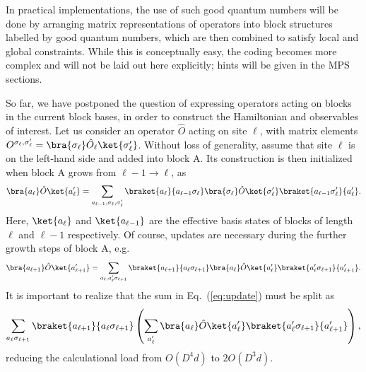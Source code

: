 In practical implementations, the use of such good quantum numbers will be done by arranging matrix representations of operators into block structures labelled by good quantum numbers, which are then combined to satisfy local and global constraints. While this is conceptually easy, the coding becomes more complex and will not be laid out here explicitly; hints will be given in the MPS sections.
 
So far, we have postponed the question of expressing operators acting on blocks in the current block bases, in order to construct the Hamiltonian and observables of interest. Let us consider an operator $\hat{O}$ acting on site $\ell$, with matrix elements $O^{\sigma_\ell,\sigma'_\ell}=\bra{\sigma_\ell} \hat{O}_{\ell} \ket{\sigma'_\ell}$. Without loss of generality, assume that site $\ell$ is on the left-hand side and added into block A. Its construction is then initialized when block A grows from $\ell-1 \rightarrow \ell$, as 
\begin{equation}
\bra{a_\ell} \hat{O} \ket{a'_\ell} = \sum_{a_{\ell-1},\sigma_\ell,\sigma'_\ell}
\braket{a_\ell}{a_{\ell-1}\sigma_\ell} \bra{\sigma_\ell} \hat{O} \ket{\sigma'_\ell} \braket{a_{\ell-1}\sigma'_\ell}{a'_\ell} .
\end{equation}
Here, $ \ket{a_\ell}$ and $\ket{a_{\ell-1}}$ are the effective basis states of blocks of length $\ell$ and $\ell-1$ respectively. Of course, updates are necessary during the further growth steps of block A, e.g.\
\begin{equation}
\bra{a_{\ell+1}} \hat{O} \ket{a'_{\ell+1}} = \sum_{a_{\ell},a'_{\ell}\sigma_{\ell+1}}
\braket{a_{\ell+1}}{a_{\ell}\sigma_{\ell+1}} \bra{a_\ell} \hat{O} \ket{a'_\ell} \braket{a'_{\ell}\sigma_{\ell+1}}{a'_{\ell+1}} .
\label{eq:update}
\end{equation}
It is important to realize that the sum in Eq.~(\ref{eq:update}) must be split as 
\begin{equation}
\sum_{a_{\ell}\sigma_{\ell+1}} \braket{a_{\ell+1}}{a_{\ell}\sigma_{\ell+1}} \left( \sum_{a'_{\ell}}
 \bra{a_\ell} \hat{O} \ket{a'_\ell} \braket{a'_{\ell}\sigma_{\ell+1}}{a'_{\ell+1}} \right),
\end{equation}
reducing the calculational load from $O(D^4 d)$ to $2O(D^3 d)$. 


